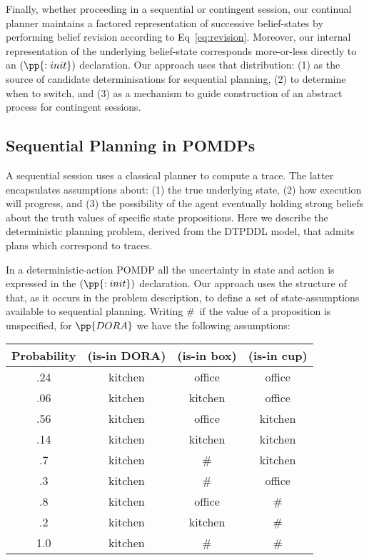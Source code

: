 Finally, whether proceeding in a sequential or contingent session, our
continual planner maintains a factored representation of successive
belief-states by performing belief revision according to
Eq~\ref{eq:revision}. Moreover, our internal representation of the
underlying belief-state corresponds more-or-less directly to an
$(\pp{:init})$ declaration. Our approach uses that distribution: (1)
as the source of candidate determinisations for sequential planning,
(2) to determine when to switch, and (3) as a mechanism to guide
construction of an abstract process for contingent sessions.



\subsection{Sequential Planning in POMDPs}

A sequential session uses a classical planner to compute a trace. The
latter encapsulates assumptions about: (1) the true underlying state,
(2) how execution will progress, and (3) the possibility of the agent
eventually holding strong beliefs about the truth values of specific
state propositions. Here we describe the deterministic planning
problem, derived from the DTPDDL model, that admits plans which
correspond to traces.

In a deterministic-action POMDP all the uncertainty in state and
action is expressed in the $(\pp{:init})$ declaration. Our approach
uses the structure of that, as it occurs in the problem description,
to define a set of state-assumptions available to sequential planning.
Writing \#\ if the value of a proposition is unspecified, for
$\pp{DORA}$ we have the following assumptions:

\small
\begin{tabular}{cccc}
\hline
Probability & (is-in DORA)  & (is-in box)  & (is-in cup) \\
\hline
.24 & kitchen & office & office \\
.06 & kitchen & kitchen & office \\
.56 & kitchen & office & kitchen \\
.14 & kitchen & kitchen & kitchen \\
.7 & kitchen & \# &  kitchen\\
.3 & kitchen & \# & office \\
.8 & kitchen & office & \# \\
.2 & kitchen & kitchen & \# \\
1.0 & kitchen & \# & \# \\
\hline
\end{tabular}
\normalsize

